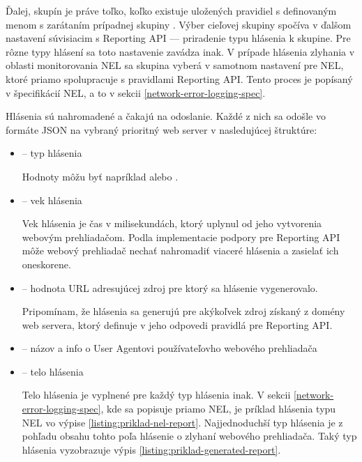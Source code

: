 Ďalej, skupín  je práve toľko, koľko existuje uložených pravidiel s definovaným menom s zarátaním prípadnej skupiny .
Výber cieľovej skupiny spočíva v ďalšom nastavení súvisiacim s Reporting API --- priradenie typu hlásenia k skupine.
Pre rôzne typy hlásení sa toto nastavenie zavádza inak.
V prípade hlásenia zlyhania v oblasti monitorovania NEL sa skupina  vyberá v samotnom nastavení pre NEL, ktoré priamo spolupracuje s pravidlami Reporting API.
Tento proces je popísaný v špecifikácií NEL, a to v sekcii \ref{network-error-logging-spec}.

Hlásenia sú nahromadené a čakajú na odoslanie.
Každé z nich sa odošle vo formáte JSON na vybraný prioritný web server v nasledujúcej štruktúre:
\begin{itemize}
    \item {} -- typ hlásenia

    Hodnoty môžu byť napríklad  alebo .
    
    \item {} -- vek hlásenia

    Vek hlásenia je čas v milisekundách, ktorý uplynul od jeho vytvorenia webovým prehliadačom.
    Podla implementacie podpory pre Reporting API môže webový prehliadač nechať nahromadiť viaceré hlásenia a zasielať ich oneskorene.
    
    \item {} -- hodnota URL adresujúcej zdroj pre ktorý sa hlásenie vygenerovalo.

    Pripomínam, že hlásenia sa generujú pre akýkoľvek zdroj získaný z domény web servera, 
    ktorý definuje v jeho odpovedi pravidlá pre Reporting API.

    
    \item {} -- názov a info o User Agentovi používateľovho webového prehliadača
    
    \item {} -- telo hlásenia

    Telo hlásenia je vyplnené pre každý typ hlásenia inak. 
    V sekcii \ref{network-error-logging-spec}, kde sa popisuje priamo NEL, je príklad hlásenia typu NEL vo výpise \ref{listing:priklad-nel-report}.
    Najjednoduchší typ hlásenia je z pohľadu obsahu tohto poľa hlásenie o zlyhaní webového prehliadača.
    Taký typ hlásenia vyzobrazuje výpis \ref{listing:priklad-generated-report}.
\end{itemize}



